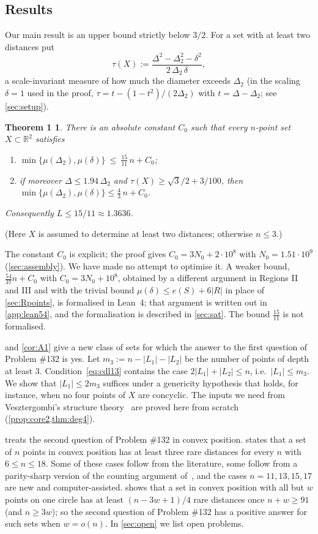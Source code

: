\documentclass[11pt]{amsart}
\newtheorem*{mainthm}{Theorem 1}
\theoremstyle{definition}
\theoremstyle{remark}
\newcommand{\R}{\mathbb{R}}
\newcommand{\Dt}{\Delta_2}
\newcommand{\mult}{\mu}
\begin{document}
\subsection*{Results}
Our main result is an upper bound strictly below $3/2$. For a set with at least two distances put
\[
\tau(X):=\frac{\Delta^2-\Dt^2-\delta^2}{2\,\Dt\,\delta},
\]
a scale-invariant measure of how much the diameter exceeds $\Dt$ (in the scaling $\delta=1$ used in the proof, $\tau=t-(1-t^2)/(2\Dt)$ with $t=\Delta-\Dt$; see \cref{sec:setup}).

\begin{mainthm}
There is an absolute constant $C_0$ such that every $n$-point set $X\subset\R^2$ satisfies
\begin{enumerate}[label=\textup{(\alph*)}]
\item $\min\{\mult(\Dt),\mult(\delta)\}\ \le\ \tfrac{15}{11}\,n+C_0$;
\item if moreover $\Delta\le1.94\,\Dt$ and $\tau(X)\ge\sqrt3/2+3/100$, then $\min\{\mult(\Dt),\mult(\delta)\}\le\tfrac43\,n+C_0$.
\end{enumerate}
Consequently $L\le 15/11\approx 1.3636$.
\end{mainthm}
(Here $X$ is assumed to determine at least two distances; otherwise $n\le3$.)

The constant $C_0$ is explicit; the proof gives $C_0=3N_0+2\cdot10^8$ with $N_0=1.51\cdot 10^9$ (\cref{sec:assembly}). We have made no attempt to optimise it. A weaker bound, $\frac{54}{37}n+C_0$ with $C_0=3N_0+10^8$, obtained by a different argument in Regions II and III and with the trivial bound $\mult(\delta)\le e(S)+6|R|$ in place of \cref{sec:Rpoints}, is formalised in Lean~4; that argument is written out in \cref{app:lean54}, and the formalisation is described in \cref{sec:sat}. The bound $\frac{15}{11}$ is not formalised.

 and \cref{cor:A1} give a new class of sets for which the answer to the first question of Problem \#132 is yes. Let $m_3:=n-|L_1|-|L_2|$ be the number of points of depth at least $3$. Condition~\eqref{eq:cdl13} contains the case $2|L_1|+|L_2|\le n$, i.e.\ $|L_1|\le m_3$. We show that $|L_1|\le 2m_3$ suffices under a genericity hypothesis that holds, for instance, when no four points of $X$ are concyclic. The inputs we need from Vesztergombi's structure theory~\cite{Ve96} are proved here from scratch (\cref{prop:core2,thm:deg4}).

 treats the second question of Problem \#132 in convex position.  states that a set of $n$ points in convex position has at least three rare distances for every $n$ with $6\le n\le 18$. Some of these cases follow from the literature, some follow from a parity-sharp version of the counting argument of~\cite{CDL25}, and the cases $n=11,13,15,17$ are new and computer-assisted.  shows that a set in convex position with all but $w$ points on one circle has at least $(n-3w+1)/4$ rare distances once $n+w\ge91$ (and $n\ge3w$); so the second question of Problem \#132 has a positive answer for such sets when $w=o(n)$. In \cref{sec:open} we list open problems.
\end{document}
